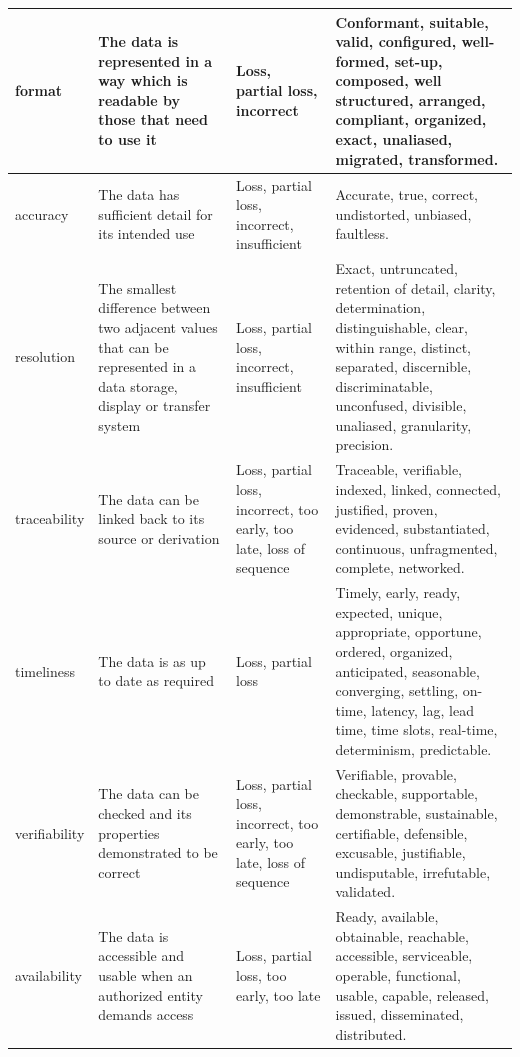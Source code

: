 \begin{longtable}{|L{}|L{}|L{}|L{}|}
  \hline
{}\Gls{format} & The data is represented in a way which is readable by those that need to use it & Loss, partial loss, incorrect & Conformant, suitable, valid, configured, well-formed, set-up, composed, well structured, arranged, compliant, organized, exact, unaliased, migrated, transformed.\\
  \hline
{}\Gls{accuracy} &
  The data has sufficient detail for its intended use &
  Loss, partial loss, incorrect, insufficient &
  Accurate, true, correct, undistorted, unbiased, faultless.\\
  \hline
{}\Gls{resolution} &
  The smallest difference between two adjacent values that can be represented in a data storage, display or transfer system &
  Loss, partial loss, incorrect, insufficient &
  Exact, untruncated, retention of detail, clarity, determination, distinguishable, clear, within range, distinct, separated, discernible, discriminatable, unconfused, divisible, unaliased, granularity, precision.\\
  \hline
  \Gls{traceability} & The data can be linked back to its source or derivation & Loss, partial loss, incorrect, too early, too late, loss of sequence & Traceable, verifiable, indexed, linked, connected, justified, proven, evidenced, substantiated, continuous, unfragmented, complete, networked.\\
  \hline
  \Gls{timeliness} & The data is as up to date as required & Loss, partial loss & Timely, early, ready, expected, unique, appropriate, opportune, ordered, organized, anticipated, seasonable, converging, settling, on-time, latency, lag, lead time, time slots, real-time, determinism, predictable.\\
  \hline
  \Gls{verifiability} & The data can be checked and its properties demonstrated to be correct & Loss, partial loss, incorrect, too early, too late, loss of sequence & Verifiable, provable, checkable, supportable, demonstrable, sustainable, certifiable, defensible, excusable, justifiable, undisputable, irrefutable, validated.\\
  \hline
{}\Gls{availability} & The data is accessible and usable when an authorized entity demands access & Loss,
  partial loss, too early, too late & Ready, available, obtainable, reachable, accessible, serviceable, operable, functional, usable, capable, released, issued, disseminated, distributed.\\

\end{longtable}

